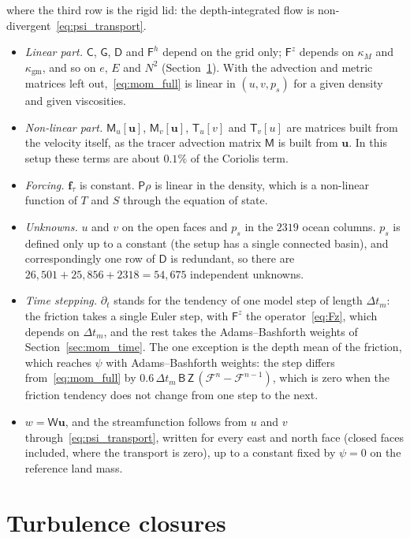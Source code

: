\documentclass{article}
\begin{document}
where the third row is the rigid lid: the depth-integrated flow is non-divergent~\eqref{eq:psi_transport}.
\begin{itemize}
\item \emph{Linear part.} $\mathsf{C}$, $\mathsf{G}$, $\mathsf{D}$ and $\mathsf{F}^h$ depend on the grid only; $\mathsf{F}^z$ depends on $\kappa_M$ and $\kappa_\text{gm}$, and so on $e$, $E$ and $N^2$ (Section~\ref{sec:closures}). With the advection and metric matrices left out,~\eqref{eq:mom_full} is linear in $(u, v, p_s)$ for a given density and given viscosities.
\item \emph{Non-linear part.} $\mathsf{M}_u[\mathbf{u}]$, $\mathsf{M}_v[\mathbf{u}]$, $\mathsf{T}_u[v]$ and $\mathsf{T}_v[u]$ are matrices built from the velocity itself, as the tracer advection matrix $\mathsf{M}$ is built from $\mathbf{u}$. In this setup these terms are about $0.1\%$ of the Coriolis term.
\item \emph{Forcing.} $\mathbf{f}_\tau$ is constant. $\mathsf{P}\rho$ is linear in the density, which is a non-linear function of $T$ and $S$ through the equation of state.
\item \emph{Unknowns.} $u$ and $v$ on the open faces and $p_s$ in the $2319$ ocean columns. $p_s$ is defined only up to a constant (the setup has a single connected basin), and correspondingly one row of $\mathsf{D}$ is redundant, so there are $26{,}501 + 25{,}856 + 2318 = 54{,}675$ independent unknowns.
\item \emph{Time stepping.} $\partial_t$ stands for the tendency of one model step of length $\Delta t_m$: the friction takes a single Euler step, with $\mathsf{F}^z$ the operator~\eqref{eq:Fz}, which depends on $\Delta t_m$, and the rest takes the Adams--Bashforth weights of Section~\ref{sec:mom_time}. The one exception is the depth mean of the friction, which reaches $\psi$ with Adams--Bashforth weights: the step differs from~\eqref{eq:mom_full} by $0.6\,\Delta t_m\,\mathsf{B}\,\mathsf{Z}\,(\mathcal{F}^n - \mathcal{F}^{n-1})$, which is zero when the friction tendency does not change from one step to the next.
\item $w = \mathsf{W}\mathbf{u}$, and the streamfunction follows from $u$ and $v$ through~\eqref{eq:psi_transport}, written for every east and north face (closed faces included, where the transport is zero), up to a constant fixed by $\psi = 0$ on the reference land mass.
\end{itemize}


\section{Turbulence closures}\label{sec:closures}
\end{document}
